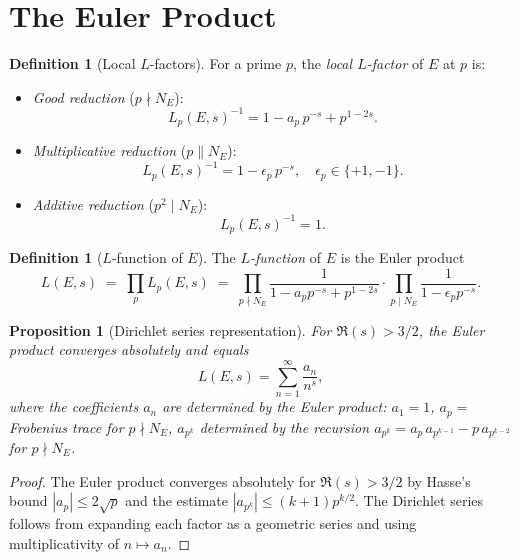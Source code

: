 \documentclass[12pt,a4paper]{amsart}
\newtheorem{proposition}[theorem]{Proposition}
\theoremstyle{definition}
\newtheorem{definition}[theorem]{Definition}
\begin{document}
\section{The Euler Product}

\begin{definition}[Local $L$-factors]
\label{def:local_factors}
For a prime $p$, the \emph{local $L$-factor} of $E$ at $p$ is:
\begin{itemize}
  \item \emph{Good reduction} ($p \nmid N_E$):
    \[
      L_p(E,s)^{-1} = 1 - a_p\,p^{-s} + p^{1-2s}.
    \]
  \item \emph{Multiplicative reduction} ($p \| N_E$):
    \[
      L_p(E,s)^{-1} = 1 - \epsilon_p\,p^{-s}, \quad
      \epsilon_p \in \{+1,-1\}.
    \]
  \item \emph{Additive reduction} ($p^2 \mid N_E$):
    \[
      L_p(E,s)^{-1} = 1.
    \]
\end{itemize}
\end{definition}

\begin{definition}[$L$-function of $E$]
\label{def:L_function}
The \emph{$L$-function} of $E$ is the Euler product
\[
  L(E,s) \;=\; \prod_p L_p(E,s)
  \;=\; \prod_{p \nmid N_E} \frac{1}{1 - a_p p^{-s} + p^{1-2s}}
        \cdot \prod_{p \mid N_E} \frac{1}{1 - \epsilon_p p^{-s}}.
\]
\end{definition}

\begin{proposition}[Dirichlet series representation]
\label{prop:dirichlet}
For $\Re(s) > 3/2$, the Euler product converges absolutely and equals
\[
  L(E,s) = \sum_{n=1}^{\infty} \frac{a_n}{n^s},
\]
where the coefficients $a_n$ are determined by the Euler product:
$a_1 = 1$, $a_p = $ Frobenius trace for $p \nmid N_E$,
$a_{p^k}$ determined by the recursion
$a_{p^k} = a_p\,a_{p^{k-1}} - p\,a_{p^{k-2}}$ for $p \nmid N_E$.
\end{proposition}

\begin{proof}
The Euler product converges absolutely for $\Re(s) > 3/2$ by Hasse's
bound $|a_p| \le 2\sqrt{p}$ and the estimate $|a_{p^k}| \le (k+1)p^{k/2}$.
The Dirichlet series follows from expanding each factor as a geometric series
and using multiplicativity of $n \mapsto a_n$.
\end{proof}
\end{document}
